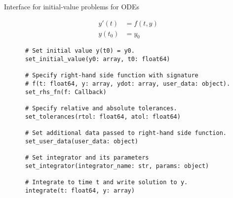 \documentclass[10pt, aspectratio=169, progressbar=frametitle]{beamer}
\begin{document}
\begin{frame}[fragile]{Interface for initial-value problems for ODEs}
  \begin{minipage}{\dimexpr0.22\textwidth-2\tabcolsep}
    \begin{align*}
      y'(t)  & = f(t, y) \\
      y(t_0) & = y_0
    \end{align*}
  \end{minipage}
  \begin{minipage}{\dimexpr0.73\textwidth-2\tabcolsep}
    {\footnotesize
    \begin{verbatim}
      # Set initial value y(t0) = y0.
      set_initial_value(y0: array, t0: float64)

      # Specify right-hand side function with signature
      # f(t: float64, y: array, ydot: array, user_data: object).
      set_rhs_fn(f: Callback)

      # Specify relative and absolute tolerances.
      set_tolerances(rtol: float64, atol: float64)

      # Set additional data passed to right-hand side function.
      set_user_data(user_data: object)

      # Set integrator and its parameters
      set_integrator(integrator_name: str, params: object)

      # Integrate to time t and write solution to y.
      integrate(t: float64, y: array)
    \end{verbatim}
    }
  \end{minipage}
\end{frame}
\end{document}
